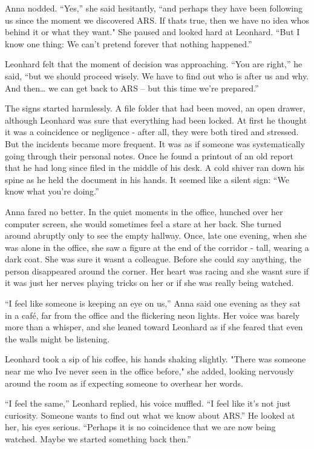 \documentclass[
]{article}
\begin{document}
Anna nodded. ``Yes,'' she said hesitantly, ``and perhaps they have been
following us since the moment we discovered ARS. If
that\textquotesingle s true, then we have no idea who\textquotesingle s
behind it or what they want." She paused and looked hard at Leonhard.
``But I know one thing: We can't pretend forever that nothing
happened.''

Leonhard felt that the moment of decision was approaching. ``You are
right,'' he said, ``but we should proceed wisely. We have to find out
who is after us and why. And then\ldots{} we can get back to ARS -- but
this time we're prepared.''

The signs started harmlessly. A file folder that had been moved, an open
drawer, although Leonhard was sure that everything had been locked. At
first he thought it was a coincidence or negligence - after all, they
were both tired and stressed. But the incidents became more frequent. It
was as if someone was systematically going through their personal notes.
Once he found a printout of an old report that he had long since filed
in the middle of his desk. A cold shiver ran down his spine as he held
the document in his hands. It seemed like a silent sign: ``We know what
you're doing.''

Anna fared no better. In the quiet moments in the office, hunched over
her computer screen, she would sometimes feel a stare at her back. She
turned around abruptly only to see the empty hallway. Once, late one
evening, when she was alone in the office, she saw a figure at the end
of the corridor - tall, wearing a dark coat. She was sure it
wasn\textquotesingle t a colleague. Before she could say anything, the
person disappeared around the corner. Her heart was racing and she
wasn\textquotesingle t sure if it was just her nerves playing tricks on
her or if she was really being watched.

``I feel like someone is keeping an eye on us,'' Anna said one evening
as they sat in a café, far from the office and the flickering neon
lights. Her voice was barely more than a whisper, and she leaned toward
Leonhard as if she feared that even the walls might be listening.

Leonhard took a sip of his coffee, his hands shaking slightly. "There
was someone near me who I\textquotesingle ve never seen in the office
before," she added, looking nervously around the room as if expecting
someone to overhear her words.

``I feel the same,'' Leonhard replied, his voice muffled. ``I feel like
it's not just curiosity. Someone wants to find out what we know about
ARS.'' He looked at her, his eyes serious. ``Perhaps it is no
coincidence that we are now being watched. Maybe we started something
back then.''
\end{document}

